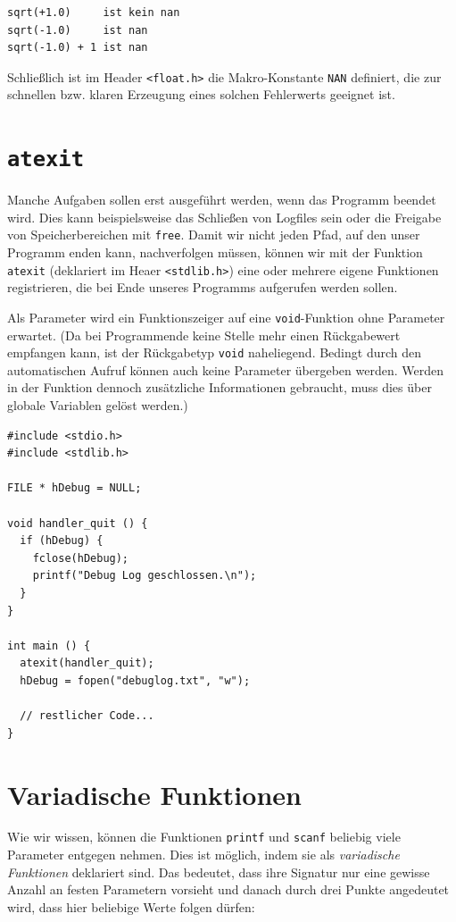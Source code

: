\begin{cmdbox}
\begin{verbatim}
sqrt(+1.0)     ist kein nan
sqrt(-1.0)     ist nan
sqrt(-1.0) + 1 ist nan
\end{verbatim}
\end{cmdbox}

Schließlich ist im Header \texttt{<float.h>} die Makro-Konstante \texttt{NAN} definiert, die zur schnellen bzw. klaren Erzeugung eines solchen Fehlerwerts geeignet ist.

\section{\texttt{atexit}}
Manche Aufgaben sollen erst ausgeführt werden, wenn das Programm beendet wird. Dies kann beispielsweise das Schließen von Logfiles sein oder die Freigabe von Speicherbereichen mit \texttt{free}.
Damit wir nicht jeden Pfad, auf den unser Programm enden kann, nachverfolgen müssen, können wir mit der Funktion \texttt{atexit} (deklariert im Heaer \texttt{<stdlib.h>}) eine oder mehrere eigene Funktionen registrieren, die bei Ende unseres Programms aufgerufen werden sollen.

Als Parameter wird ein Funktionszeiger auf eine \texttt{void}-Funktion ohne Parameter erwartet. (Da bei Programmende keine Stelle mehr einen Rückgabewert empfangen kann, ist der Rückgabetyp \texttt{void} naheliegend. Bedingt durch den automatischen Aufruf können auch keine Parameter übergeben werden. Werden in der Funktion dennoch zusätzliche Informationen gebraucht, muss dies über globale Variablen gelöst werden.)

\begin{codebox}
\begin{verbatim}
#include <stdio.h>
#include <stdlib.h>

FILE * hDebug = NULL;

void handler_quit () {
  if (hDebug) {
    fclose(hDebug);
    printf("Debug Log geschlossen.\n");
  }
}

int main () {
  atexit(handler_quit);
  hDebug = fopen("debuglog.txt", "w");
  
  // restlicher Code...
}
\end{verbatim}
\end{codebox}


\section{Variadische Funktionen}
Wie wir wissen, können die Funktionen \texttt{printf} und \texttt{scanf} beliebig viele Parameter entgegen nehmen. Dies ist möglich, indem sie als \emph{variadische Funktionen} deklariert sind. Das bedeutet, dass ihre Signatur nur eine gewisse Anzahl an festen Parametern vorsieht und danach durch drei Punkte angedeutet wird, dass hier beliebige Werte folgen dürfen:

